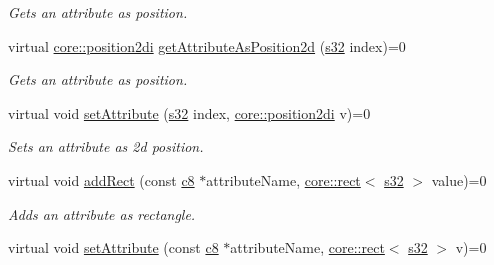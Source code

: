\begin{DoxyCompactItemize}
\begin{DoxyCompactList}\small\item\em Gets an attribute as position. \end{DoxyCompactList}\item 
virtual \hyperlink{namespaceirr_1_1core_ace0f1379db5f9f5660456ec57ab78202}{core\+::position2di} \hyperlink{classirr_1_1io_1_1IAttributes_a11afd9cf70fb04706e26ef15a3423d9a}{get\+Attribute\+As\+Position2d} (\hyperlink{namespaceirr_ac66849b7a6ed16e30ebede579f9b47c6}{s32} index)=0
\begin{DoxyCompactList}\small\item\em Gets an attribute as position. \end{DoxyCompactList}\item 
\mbox{\label{classirr_1_1io_1_1IAttributes_a164e65ef2719645ee55d263f98d67530}} 
virtual void \hyperlink{classirr_1_1io_1_1IAttributes_a164e65ef2719645ee55d263f98d67530}{set\+Attribute} (\hyperlink{namespaceirr_ac66849b7a6ed16e30ebede579f9b47c6}{s32} index, \hyperlink{namespaceirr_1_1core_ace0f1379db5f9f5660456ec57ab78202}{core\+::position2di} v)=0
\begin{DoxyCompactList}\small\item\em Sets an attribute as 2d position. \end{DoxyCompactList}\item 
\mbox{\label{classirr_1_1io_1_1IAttributes_ab96f842013ac61bb75a460c073d90c57}} 
virtual void \hyperlink{classirr_1_1io_1_1IAttributes_ab96f842013ac61bb75a460c073d90c57}{add\+Rect} (const \hyperlink{namespaceirr_a9395eaea339bcb546b319e9c96bf7410}{c8} $\ast$attribute\+Name, \hyperlink{classirr_1_1core_1_1rect}{core\+::rect}$<$ \hyperlink{namespaceirr_ac66849b7a6ed16e30ebede579f9b47c6}{s32} $>$ value)=0
\begin{DoxyCompactList}\small\item\em Adds an attribute as rectangle. \end{DoxyCompactList}\item 
\mbox{\label{classirr_1_1io_1_1IAttributes_aa564013b1dda96e618f949a8308af4b1}} 
virtual void \hyperlink{classirr_1_1io_1_1IAttributes_aa564013b1dda96e618f949a8308af4b1}{set\+Attribute} (const \hyperlink{namespaceirr_a9395eaea339bcb546b319e9c96bf7410}{c8} $\ast$attribute\+Name, \hyperlink{classirr_1_1core_1_1rect}{core\+::rect}$<$ \hyperlink{namespaceirr_ac66849b7a6ed16e30ebede579f9b47c6}{s32} $>$ v)=0

\end{DoxyCompactItemize}
